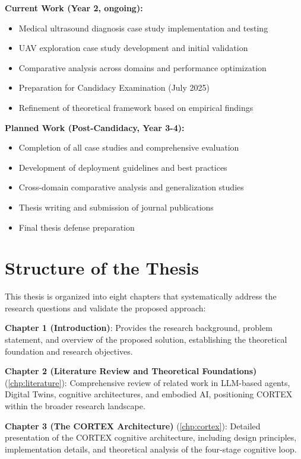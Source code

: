 \textbf{Current Work (Year 2, ongoing):}
\begin{itemize}
    \item Medical ultrasound diagnosis case study implementation and testing
    \item UAV exploration case study development and initial validation
    \item Comparative analysis across domains and performance optimization
    \item Preparation for Candidacy Examination (July 2025)
    \item Refinement of theoretical framework based on empirical findings
\end{itemize}

\textbf{Planned Work (Post-Candidacy, Year 3-4):}
\begin{itemize}
    \item Completion of all case studies and comprehensive evaluation
    \item Development of deployment guidelines and best practices
    \item Cross-domain comparative analysis and generalization studies
    \item Thesis writing and submission of journal publications
    \item Final thesis defense preparation
\end{itemize}

\section{Structure of the Thesis}

This thesis is organized into eight chapters that systematically address the research questions and validate the proposed approach:

\textbf{Chapter 1 (Introduction)}: Provides the research background, problem statement, and overview of the proposed solution, establishing the theoretical foundation and research objectives.

\textbf{Chapter 2 (Literature Review and Theoretical Foundations)} (\autoref{chp:literature}): Comprehensive review of related work in LLM-based agents, Digital Twins, cognitive architectures, and embodied AI, positioning CORTEX within the broader research landscape.

\textbf{Chapter 3 (The CORTEX Architecture)} (\autoref{chp:cortex}): Detailed presentation of the CORTEX cognitive architecture, including design principles, implementation details, and theoretical analysis of the four-stage cognitive loop.

